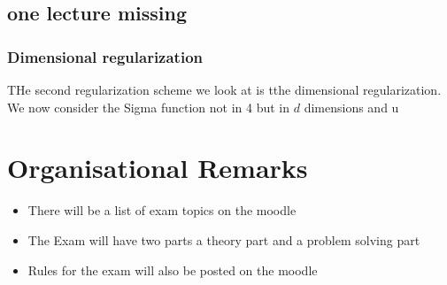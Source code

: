 \documentclass{report}
\begin{document}
\section*{one lecture missing}
\subsection{Dimensional regularization}
THe second regularization scheme we look at is tthe dimensional regularization. We now consider the Sigma function not in 4 but in $d$ dimensions and u




























\chapter{Organisational Remarks}
\begin{itemize}
  \item There will be a list of exam topics on the moodle
  \item The Exam will have two parts a theory part and a problem solving part
  \item Rules for the exam will also be posted on the moodle 
\end{itemize}
\end{document}
